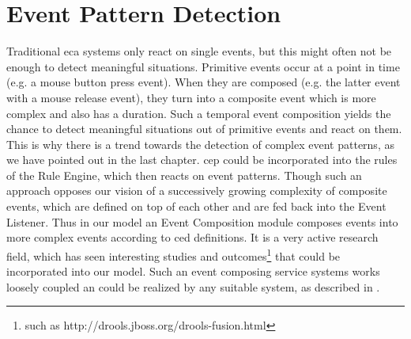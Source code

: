\section{Event Pattern Detection}
Traditional \textrm{\acrshort{eca}} systems only react on single events, but this might often not be enough to detect meaningful situations.
Primitive events occur at a point in time (e.g. a mouse button press event).
When they are composed (e.g. the latter event with a mouse release event), they turn into a composite event which is more complex and also has a duration.
Such a temporal event composition yields the chance to detect meaningful situations out of primitive events and react on them.
This is why there is a trend towards the detection of complex event patterns, as we have pointed out in the last chapter.
\textrm{\acrshort{cep}} could be incorporated into the rules of the \textrm{Rule Engine}, which then reacts on event patterns.
Though such an approach opposes our vision of a successively growing complexity of composite events, which are defined on top of each other and are fed back into the \textrm{Event Listener}.
Thus in our model an \textrm{Event Composition} module composes events into more complex events according to \textrm{\acrshort{ced}} definitions.
It is a very active research field, which has seen interesting studies\cite{akdere2008plan}\cite{2004_1265833} and outcomes\footnote{such as http://drools.jboss.org/drools-fusion.html} that could be incorporated into our model.
Such an event composing service systems works loosely coupled an could be realized by any suitable system, as described in \cite{robins2010complex}.



